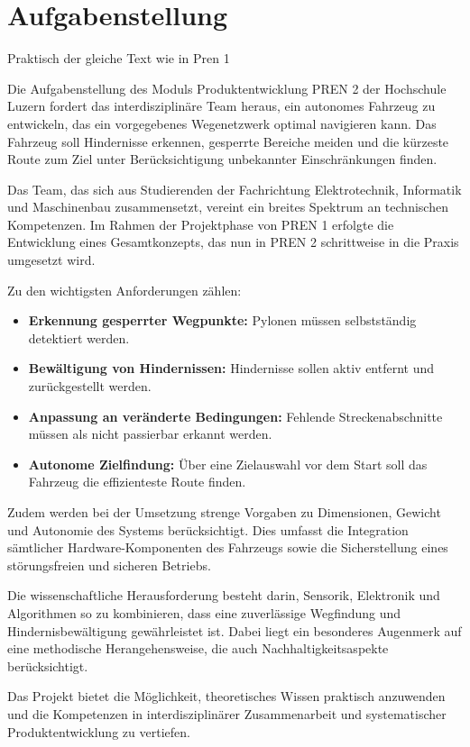 \documentclass[main.tex]{subfiles} %
\begin{document}

\section{Aufgabenstellung}

Praktisch der gleiche Text wie in Pren 1

Die Aufgabenstellung des Moduls Produktentwicklung PREN 2 der
Hochschule Luzern fordert das interdisziplinäre Team heraus, ein autonomes 
Fahrzeug zu entwickeln, das ein vorgegebenes Wegenetzwerk optimal navigieren kann. 
Das Fahrzeug soll Hindernisse erkennen, gesperrte Bereiche meiden und die kürzeste 
Route zum Ziel unter Berücksichtigung unbekannter Einschränkungen finden.

Das Team, das sich aus Studierenden der Fachrichtung Elektrotechnik, Informatik und Maschinenbau 
zusammensetzt, vereint ein breites Spektrum an technischen Kompetenzen. Im Rahmen der Projektphase von PREN 1 
erfolgte die Entwicklung eines Gesamtkonzepts, das nun in PREN 2 schrittweise in die Praxis umgesetzt wird.

Zu den wichtigsten Anforderungen zählen:
\begin{itemize}
    \item \textbf{Erkennung gesperrter Wegpunkte:} Pylonen müssen selbstständig detektiert werden.
    \item \textbf{Bewältigung von Hindernissen:} Hindernisse sollen aktiv entfernt und zurückgestellt werden.
    \item \textbf{Anpassung an veränderte Bedingungen:} Fehlende Streckenabschnitte müssen als nicht passierbar erkannt werden.
    \item \textbf{Autonome Zielfindung:} Über eine Zielauswahl vor dem Start soll das Fahrzeug die effizienteste Route finden.
\end{itemize}

Zudem werden bei der Umsetzung strenge Vorgaben zu Dimensionen, Gewicht und
Autonomie des Systems berücksichtigt. Dies umfasst die Integration sämtlicher
Hardware-Komponenten des Fahrzeugs sowie die Sicherstellung eines
störungsfreien und sicheren Betriebs.

Die wissenschaftliche Herausforderung besteht darin, Sensorik, Elektronik 
und Algorithmen so zu kombinieren, dass eine zuverlässige Wegfindung und 
Hindernisbewältigung gewährleistet ist. Dabei liegt ein besonderes Augenmerk auf 
eine methodische Herangehensweise, die auch Nachhaltigkeitsaspekte berücksichtigt.

Das Projekt bietet die Möglichkeit, theoretisches Wissen praktisch 
anzuwenden und die Kompetenzen in interdisziplinärer Zusammenarbeit 
und systematischer Produktentwicklung zu vertiefen.
\end{document}
